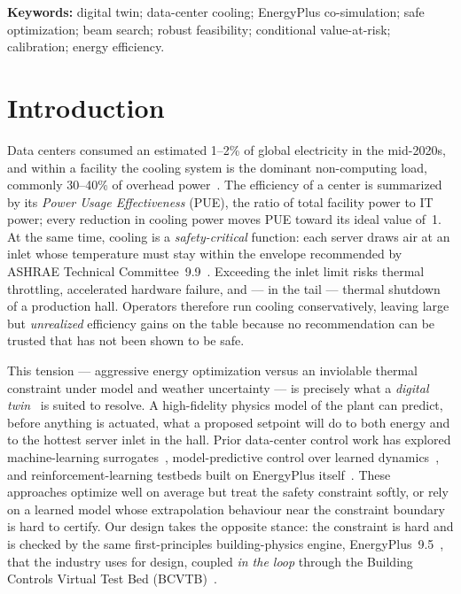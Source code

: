 \documentclass[11pt]{article}
\begin{document}
\begin{titlepage}
\begin{minipage}{0.86\textwidth}
\vspace{0.4cm}
\noindent\textbf{Keywords:} digital twin; data-center cooling; EnergyPlus co-simulation;
safe optimization; beam search; robust feasibility; conditional value-at-risk;
calibration; energy efficiency.
\end{minipage}

\vfill
\end{titlepage}

\section{Introduction}
\label{sec:intro}

Data centers consumed an estimated 1--2\% of global electricity in the mid-2020s, and
within a facility the cooling system is the dominant non-computing load, commonly
30--40\% of overhead power~\cite{barroso,greengrid,patterson}. The efficiency of a
center is summarized by its \emph{Power Usage Effectiveness} (PUE), the ratio of total
facility power to IT power; every reduction in cooling power moves PUE toward its ideal
value of~1. At the same time, cooling is a \emph{safety-critical} function: each server
draws air at an inlet whose temperature must stay within the envelope recommended by
ASHRAE Technical Committee~9.9~\cite{ashrae}. Exceeding the inlet limit risks thermal
throttling, accelerated hardware failure, and --- in the tail --- thermal shutdown of a
production hall. Operators therefore run cooling conservatively, leaving large but
\emph{unrealized} efficiency gains on the table because no recommendation can be trusted
that has not been shown to be safe.

This tension --- aggressive energy optimization versus an inviolable thermal constraint
under model and weather uncertainty --- is precisely what a \emph{digital
twin}~\cite{glaessgen} is suited to resolve. A high-fidelity physics model of the plant
can predict, before anything is actuated, what a proposed setpoint will do to both energy
and to the hottest server inlet in the hall. Prior data-center control work has explored
machine-learning surrogates~\cite{gao}, model-predictive control over learned
dynamics~\cite{lazic}, and reinforcement-learning testbeds built on EnergyPlus
itself~\cite{moriyama}. These approaches optimize well on average but treat the safety
constraint softly, or rely on a learned model whose extrapolation behaviour near the
constraint boundary is hard to certify. Our design takes the opposite stance: the
constraint is hard and is checked by the same first-principles building-physics engine,
EnergyPlus~9.5~\cite{energyplus,eplusref}, that the industry uses for design, coupled
\emph{in the loop} through the Building Controls Virtual Test Bed (BCVTB)~\cite{bcvtb}.
\end{document}
